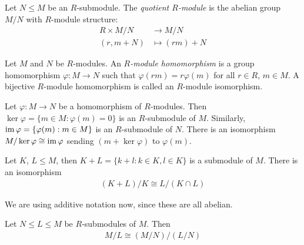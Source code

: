 \documentclass{../../template/note}
\begin{document}
    \begin{definition}
        Let $N \leq M$ be an $R$-submodule. The \emph{quotient $R$-module} is the abelian group $M/N$ with $R$-module structure:
        \begin{align*}
            R \times M/N &\to M/N \\
            (r, m + N) &\mapsto (rm) + N
        \end{align*}
    \end{definition}
    
    \begin{definition}
        Let $M$ and $N$ be $R$-modules. An \emph{$R$-module homomorphism} is a group homomorphism $\varphi: M \to N$ such that $\varphi(rm) = r\varphi(m)$ for all $r \in R$, $m \in M$. A bijective $R$-module homomorphism is called an $R$-module isomorphism.
    \end{definition}
    
    \begin{theorem}
        Let $\varphi: M \to N$ be a homomorphism of $R$-modules. Then $\ker\varphi = \{m \in M: \varphi(m) = 0\}$ is an $R$-submodule of $M$. Similarly, $\operatorname{im}\varphi = \{\varphi(m): m \in M\}$ is an $R$-submodule of $N$. There is an isomorphism $M/\ker\varphi \cong \operatorname{im}\varphi$ sending $(m+\ker\varphi)$ to $\varphi(m)$.
    \end{theorem}
    
    \begin{theorem}
        Let $K$, $L \leq M$, then $K+L=\{k+l: k \in K, l \in K\}$ is a submodule of $M$. There is an isomorphism
        \begin{align*}
            (K+L)/K \cong L/(K \cap L)
        \end{align*}
    \end{theorem}
    
    \begin{remark*}
        We are using additive notation now, since these are all abelian.
    \end{remark*}
    
    \begin{theorem}
        Let $N \leq L \leq M$ be $R$-submodules of $M$. Then
        \begin{align*}
            M/L \cong (M/N)/(L/N)
        \end{align*}
    \end{theorem}
    
\end{document}
